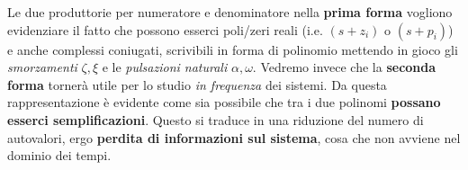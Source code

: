 \bb
Le due produttorie per numeratore e denominatore nella \textbf{prima forma} vogliono evidenziare il fatto che possono esserci poli/zeri reali (i.e. $(s+z_i)$ o $(s+p_i)$) e anche complessi coniugati, scrivibili in forma di polinomio mettendo in gioco gli \textit{smorzamenti} $\zeta, \xi$ e le \textit{pulsazioni naturali} $\alpha, \omega$. Vedremo invece che la \textbf{seconda forma} tornerà utile per lo studio \textit{in frequenza} dei sistemi.
\bb
Da questa rappresentazione è evidente come sia possibile che tra i due polinomi  \textbf{possano esserci semplificazioni}. Questo si traduce in una riduzione del numero di autovalori, ergo  \textbf{perdita di informazioni sul sistema}, cosa che non avviene nel dominio dei tempi. 
